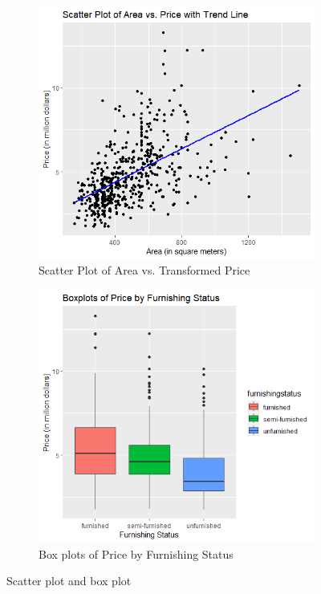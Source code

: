 \documentclass[10pt]{article}
\begin{document}
\begin{figure}[H]
  \centering
  \begin{subfigure}{0.3\textwidth}
    \includegraphics[width=\linewidth]{Final project/Visualizations/Scatterplot.png}
    \caption{Scatter Plot of Area vs. Transformed Price}
    \label{fig:1a}
  \end{subfigure}
  \begin{subfigure}{0.3\textwidth}
    \includegraphics[width=\linewidth]{Final project/Visualizations/Boxplot.png}
    \caption{Box plots of Price by Furnishing Status}
    \label{fig:1b}
  \end{subfigure}
  \caption{Scatter plot and box plot}
  \label{fig:1}
\end{figure}
\end{document}
